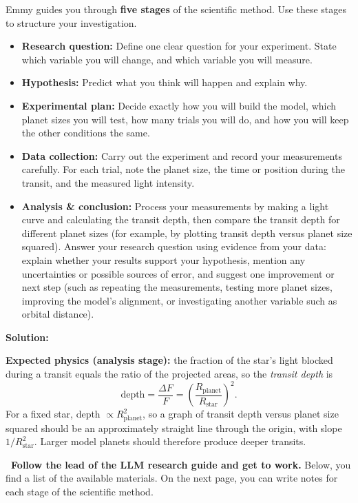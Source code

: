 \documentclass[12pt]{article}
\newcounter{question}
\newenvironment{solution}{%
  \begin{solutionbox}\textbf{Solution:}
}{%
  \end{solutionbox}
}
\begin{document}
Emmy guides you through \textbf{five stages} of the scientific method. Use these stages to structure your investigation.
\begin{itemize}
  \item \textbf{Research question:} Define one clear question for your experiment. State which variable you will change, and which variable you will measure.
  \item \textbf{Hypothesis:} Predict what you think will happen and explain why. 
  \item \textbf{Experimental plan:} Decide exactly how you will build the model, which planet sizes you will test, how many trials you will do, and how you will keep the other conditions the same.
  \item \textbf{Data collection:} Carry out the experiment and record your measurements carefully. For each trial, note the planet size, the time or position during the transit, and the measured light intensity.
  \item \textbf{Analysis \& conclusion:} Process your measurements by making a light curve and calculating the transit depth, then compare the transit depth for different planet sizes (for example, by plotting transit depth versus planet size squared). Answer your research question using evidence from your data: explain whether your results support your hypothesis, mention any uncertainties or possible sources of error, and suggest one improvement or next step (such as repeating the measurements, testing more planet sizes, improving the model's alignment, or investigating another variable such as orbital distance).
\end{itemize}

\begin{solution}
\textbf{Expected physics (analysis stage):} the fraction of the star's light blocked during a transit equals the ratio of the projected areas, so the \emph{transit depth} is
\[
\text{depth} = \frac{\Delta F}{F} = \left(\frac{R_\mathrm{planet}}{R_\mathrm{star}}\right)^{2}.
\]
For a fixed star, depth $\propto R_\mathrm{planet}^{2}$, so a graph of transit depth versus planet size squared should be an approximately straight line through the origin, with slope $1/R_\mathrm{star}^{2}$. Larger model planets should therefore produce deeper transits.
\end{solution}

\textcolor{maincolor}{\textbf{\faPen\ Follow the lead of the LLM research guide and get to work.}} Below, you find a list of the available materials. On the next page, you can write notes for each stage of the scientific method.
 
\end{document}
